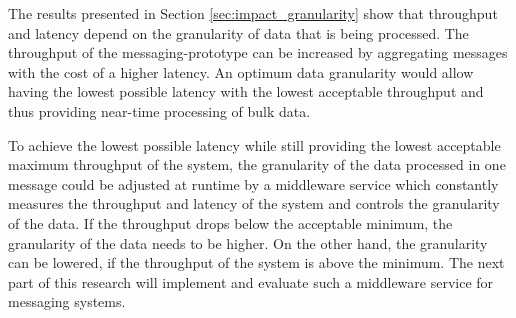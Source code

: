 The results presented in Section \ref{sec:impact_granularity} show that throughput and latency depend on the granularity of data that is being processed. The throughput of the messaging-prototype can be increased by aggregating messages with the cost of a higher latency. An optimum data granularity would allow having the lowest possible latency with the lowest acceptable throughput and thus providing near-time processing of bulk data.

To achieve the lowest possible latency while still providing the lowest acceptable maximum throughput of the system, the granularity of the data processed in one message could be adjusted at runtime by a middleware service which constantly measures the throughput and latency of the system and controls the granularity of the data. If the throughput drops below the acceptable minimum, the granularity of the data needs to be higher. On the other hand, the granularity can be lowered, if the throughput of the system is above the minimum. The next part of this research will implement and evaluate such a middleware service for messaging systems.
